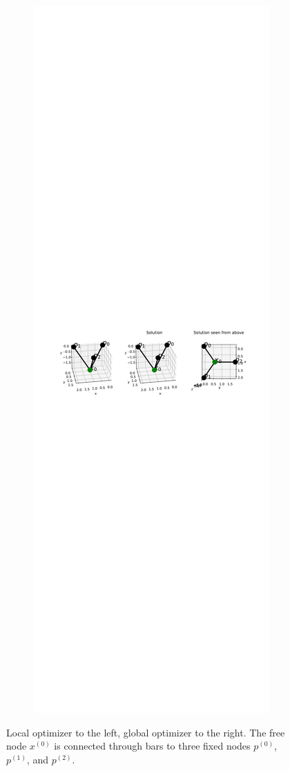 \begin{figure}
\begin{subfigure}{.5\textwidth}
  \label{fig:}
\end{subfigure}%
\begin{subfigure}{.5\textwidth}
  \centering
  \includegraphics[width=1\linewidth]{Bilder/localminneg.pdf}
  \label{fig:sub2}
\end{subfigure}
\caption{Local optimizer to the left, global optimizer to the right. The free node $x^{(0)}$ is connected through bars to three fixed nodes  $p^{(0)}$, $p^{(1)}$, and $p^{(2)}$.}
\label{fig:local_optimizer}
\end{figure}


